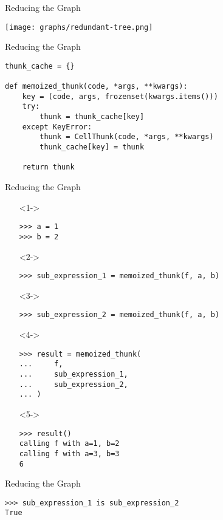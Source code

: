 \documentclass{beamer}
\begin{document}
\begin{frame}{Reducing the Graph}
  \begin{center}
    \texttt{[image: graphs/redundant-tree.png]}
   \end{center}
\end{frame}

\begin{frame}[fragile]{Reducing the Graph}
  \begin{verbatim}
thunk_cache = {}

def memoized_thunk(code, *args, **kwargs):
    key = (code, args, frozenset(kwargs.items()))
    try:
        thunk = thunk_cache[key]
    except KeyError:
        thunk = CellThunk(code, *args, **kwargs)
        thunk_cache[key] = thunk

    return thunk
  \end{verbatim}
\end{frame}

\begin{frame}[fragile]{Reducing the Graph}
  \begin{itemize}
  \item[]<1-> \begin{verbatim}
>>> a = 1
>>> b = 2
    \end{verbatim}
  \item[]<2-> \begin{verbatim}
>>> sub_expression_1 = memoized_thunk(f, a, b)
    \end{verbatim}
  \item[]<3-> \begin{verbatim}
>>> sub_expression_2 = memoized_thunk(f, a, b)
    \end{verbatim}
  \item[]<4-> \begin{verbatim}
>>> result = memoized_thunk(
...     f,
...     sub_expression_1,
...     sub_expression_2,
... )
    \end{verbatim}
  \item[]<5-> \begin{verbatim}
>>> result()
calling f with a=1, b=2
calling f with a=3, b=3
6
    \end{verbatim}
  \end{itemize}
\end{frame}

\begin{frame}[fragile]{Reducing the Graph}
  \begin{verbatim}
>>> sub_expression_1 is sub_expression_2
True
  \end{verbatim}
\end{frame}
\end{document}
